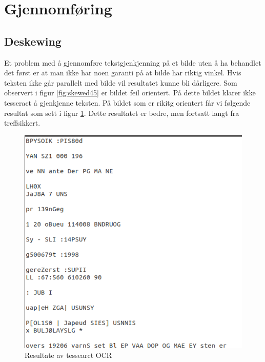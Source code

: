 \documentclass{article}
\begin{document}
\section{Gjennomføring}
\subsection{Deskewing}
Et problem med å gjennomføre tekstgjenkjenning på et bilde uten å ha behandlet det først er at man ikke har noen garanti på at bilde har riktig vinkel. Hvis teksten ikke går parallelt med bilde vil resultatet kunne bli dårligere. Som observert i figur \ref{fig:skewed45} er bildet feil orientert. På dette bildet klarer ikke tesseract å gjenkjenne teksten. På bildet som er rikitg orientert får vi følgende resultat som sett i figur \ref{fig:skewed10result}. Dette resultatet er bedre, men fortsatt langt fra treffsikkert.


\begin{figure}[h]
\centering
\includegraphics[scale=0.6]{images/skewed10results}
\caption{Resultate av tessearct OCR}
\label{fig:skewed10result}
\end{figure}
\end{document}
